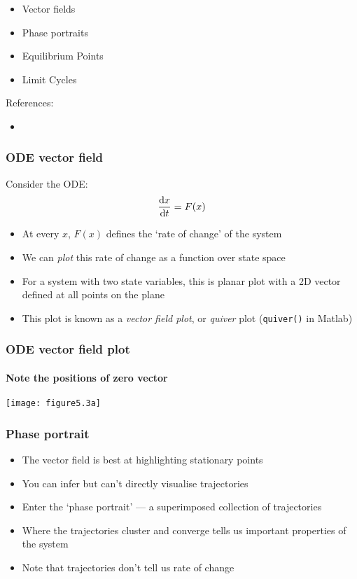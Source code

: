 \documentclass{beamer-control}
\begin{document}

\begin{SUMMARY}
\begin{itemize}
\item Vector fields
\item Phase portraits
\item Equilibrium Points
\item Limit Cycles
\end{itemize}
\vfill References:
\begin{itemize}
\item {}
\end{itemize}
\printbibliography
\end{SUMMARY}




\begin{frame}
\frametitle{ODE vector field}
Consider the ODE:
\begin{align}
\frac{\mathrm{d} x}{\mathrm{d} t} = F(x)
\end{align}
\begin{itemize}
\item At every $x$, $F(x)$ defines the `rate of change' of the system
\item We can \emph{plot} this rate of change as a function over state space
\item For a system with two state variables, this is planar plot with a 2D vector defined at all points on the plane
\item This plot is known as a \emph{vector field plot}, or \emph{quiver} plot (\texttt{quiver()} in Matlab)
\end{itemize}
\end{frame}

\begin{frame}
\frametitle{ODE vector field plot}
\framesubtitle{Note the positions of zero vector}
\texttt{[image: figure5.3a]}
\end{frame}

\begin{frame}
\frametitle{Phase portrait}
\begin{itemize}
\item The vector field is best at highlighting stationary points
\item You can infer but can't directly visualise trajectories
\item Enter the `phase portrait' --- a superimposed collection of trajectories 
\item Where the trajectories cluster and converge tells us important properties of the system
\item Note that trajectories don't tell us rate of change
\end{itemize}
\end{frame}
\end{document}
